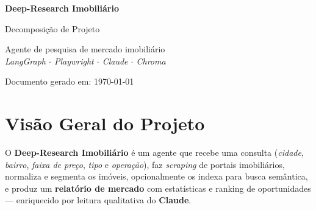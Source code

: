 \documentclass[12pt, a4paper]{article}
\title{}
\author{}
\date{}
\begin{document}
\begin{titlepage}
  \centering
  \vspace*{1.5cm}
  {\Huge\bfseries\color{corPrimaria} Deep-Research Imobiliário \par}
  \vspace{0.4cm}
  {\Large Decomposição de Projeto \par}
  \vspace{0.3cm}
  {\large Agente de pesquisa de mercado imobiliário\\[2pt]
   \textit{LangGraph $\cdot$ Playwright $\cdot$ Claude $\cdot$ Chroma}\par}
  \vspace{1.2cm}


  \vfill
  {\large Documento gerado em: \today \par}
  \vspace{0.5cm}
\end{titlepage}

\tableofcontents
\newpage

\section{Visão Geral do Projeto}

O \textbf{Deep-Research Imobiliário} é um agente que recebe uma consulta
(\emph{cidade}, \emph{bairro}, \emph{faixa de preço}, \emph{tipo} e
\emph{operação}), faz \emph{scraping} de portais imobiliários, normaliza e
segmenta os imóveis, opcionalmente os indexa para busca semântica, e produz um
\textbf{relatório de mercado} com estatísticas e ranking de oportunidades —
enriquecido por leitura qualitativa do \textbf{Claude}.
\end{document}
